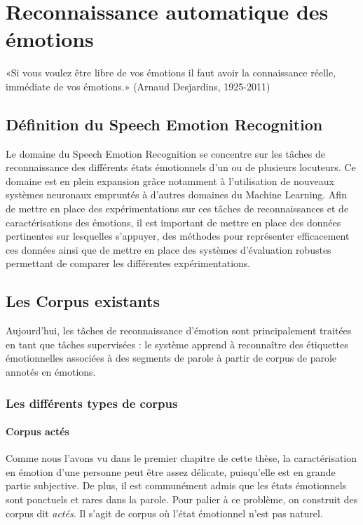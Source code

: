 \chapter{Reconnaissance automatique des émotions}
\label{chapitre3}
«Si vous voulez être libre de vos émotions il faut avoir la connaissance réelle, immédiate de vos émotions.»  (Arnaud Desjardins, 1925-2011)


\section{Définition du Speech Emotion Recognition}
Le domaine du Speech Emotion Recognition se concentre sur les tâches de reconnaissance des différents états émotionnels d'un ou de plusieurs locuteurs. Ce domaine est en plein expansion grâce notamment à l'utilisation de nouveaux systèmes neuronaux empruntés à d'autres domaines du Machine Learning.
Afin de mettre en place des expérimentations sur ces tâches de reconnaissances et de caractérisations des émotions, il est important de mettre en place des données pertinentes sur lesquelles s'appuyer, des méthodes pour représenter efficacement ces données ainsi que de mettre en place des systèmes d'évaluation robustes permettant de comparer les différentes expérimentations.

\section{Les Corpus existants}
Aujourd'hui, les tâches de reconnaissance d'émotion sont principalement traitées en tant que tâches supervisées : le système apprend à reconnaître des étiquettes émotionnelles associées à des segments de parole à partir de corpus de parole annotés en émotions.

\subsection{Les différents types de corpus}
\subsubsection{Corpus actés}
Comme nous l'avons vu dans le premier chapitre de cette thèse, la caractérisation en émotion d'une personne peut être assez délicate, puisqu'elle est en grande partie subjective. De plus, il est communément admis que les états émotionnels sont ponctuels et rares dans la parole. Pour palier à ce problème, on construit des corpus dit \textit{actés}. Il s'agit de corpus où l'état émotionnel n'est pas naturel.

